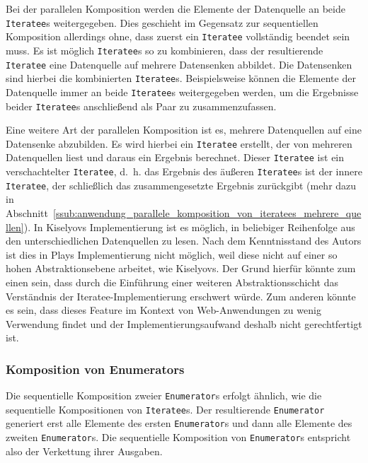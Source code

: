 Bei der parallelen Komposition werden die Elemente der Datenquelle an beide \lstinline|Iteratee|s weitergegeben.
Dies geschieht im Gegensatz zur sequentiellen Komposition allerdings ohne, dass zuerst ein \lstinline|Iteratee| vollständig beendet sein muss.
Es ist möglich \lstinline|Iteratee|s so zu kombinieren, dass der resultierende \lstinline|Iteratee| eine Datenquelle auf mehrere Datensenken abbildet.
Die Datensenken sind hierbei die kombinierten \lstinline|Iteratee|s.
Beispielsweise können die Elemente der Datenquelle immer an beide \lstinline|Iteratee|s weitergegeben werden, um die Ergebnisse beider \lstinline|Iteratee|s anschließend als Paar zu zusammenzufassen. %

Eine weitere Art der parallelen Komposition ist es, mehrere Datenquellen auf eine Datensenke abzubilden.
Es wird hierbei ein \lstinline|Iteratee| erstellt, der von mehreren Datenquellen liest und daraus ein Ergebnis berechnet.
Dieser \lstinline|Iteratee| ist ein verschachtelter \lstinline|Iteratee|, d.~h. das Ergebnis des äußeren \lstinline|Iteratee|s ist der innere \lstinline|Iteratee|, der schließlich das zusammengesetzte Ergebnis zurückgibt (mehr dazu in Abschnitt~\ref{ssub:anwendung_parallele_komposition_von_iteratees_mehrere_quellen}).
In Kiselyovs Implementierung ist es möglich, in beliebiger Reihenfolge aus den unterschiedlichen Datenquellen zu lesen.
Nach dem Kenntnisstand des Autors ist dies in Plays Implementierung nicht möglich, weil diese nicht auf einer so hohen Abstraktionsebene arbeitet, wie Kiselyovs.
Der Grund hierfür könnte zum einen sein, dass durch die Einführung einer weiteren Abstraktionsschicht das Verständnis der Iteratee-Implementierung erschwert würde.
Zum anderen könnte es sein, dass dieses Feature im Kontext von Web-Anwendungen zu wenig Verwendung findet und der Implementierungsaufwand deshalb nicht gerechtfertigt ist.


\subsubsection{Komposition von Enumerators} %
\label{ssub:komposition_von_enumerators}

Die sequentielle Komposition zweier \lstinline|Enumerator|s erfolgt ähnlich, wie die sequentielle Kompositionen von \lstinline|Iteratee|s.
Der resultierende \lstinline|Enumerator| generiert erst alle Elemente des ersten \lstinline|Enumerator|s und dann alle Elemente des zweiten \lstinline|Enumerator|s.
Die sequentielle Komposition von \lstinline|Enumerator|s entspricht also der Verkettung ihrer Ausgaben. %

